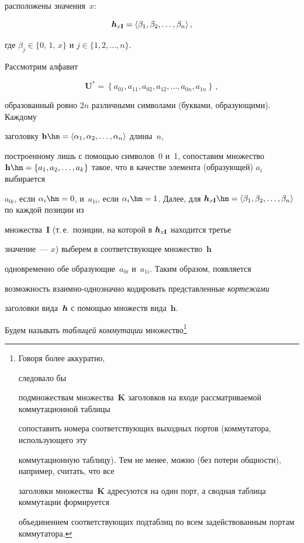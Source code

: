 расположены значения~${x}$: 

     $$

     \mbox{\bih}_{x\mathbf{I}}=\langle \beta_1,\beta_2, \ldots ,\beta_n\rangle\,,

     $$

     где $\beta_j \in\{0,\,1,\,x\}$ и $j\in\{1, 2, \ldots , n\}$.

     

    Рассмотрим алфавит

    $$

    \mathbf{U}^* =\left\{ a_{01},a_{11},a_{02},a_{12}, \ldots , a_{0n},a_{1n}\right\}\,,

    $$

образованный ровно $2n$ различными символами (буквами, образующими). Каж\-до\-му 

заголовку $\mathbf{h}\hm = \langle \alpha_1,\alpha_2,\ldots ,\alpha_n\rangle$ длины~$n$, 

построенному лишь с помощью символов~0 и~1, сопоставим множество $\mathbf{h}\hm = 

\{a_1, a_2, \ldots , a_k\}$ такое, что в качестве элемента (образующей) $a_i$ выбирается 

$a_{0i}$, если $\alpha_i \hm= 0$, и~$a_{1i}$, если $\alpha_i \hm= 1$. Далее, для $\mbox{\bih}_{x\mathbf{I}}\hm = 

\langle\beta_1, \beta_2, \ldots , \beta_n\rangle$ по каждой позиции из 

множества~$\mathbf{I}$ (т.\,е.\ позиции, на которой в $\mbox{{\boldmath${h}$}}_{x\mathbf{I}}$ находится третье 

значение~--- ${x}$) выберем в соответствующее множество~$\mathbf{h}$ 

одновременно обе образующие~$a_{0i}$ и~$a_{1i}$. Таким образом, появляется 

возможность вза\-им\-но-од\-но\-знач\-но кодировать представленные \textit{кортежами} 

заголовки вида~$\mbox{{\boldmath${h}$}}$ с помощью множеств вида~$\mathbf{h}$.

     

Будем называть \textit{таблицей коммутации} множество\footnote[2]{Говоря более аккуратно, 

следовало бы 

подмножествам множества~$\mathbf{K}$ заголовков на входе рассматриваемой коммутационной таблицы 

сопоставить номера соответствующих выходных портов (коммутатора, использующего эту 

коммутационную таблицу). Тем не менее, можно (без потери общности), например, считать, что все 

заголовки множества~$\mathbf{K}$ адресуются на один порт, а сводная таблица коммутации формируется 

объединением соответствующих подтаблиц по всем задействованным портам коммутатора.} 

